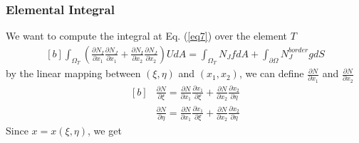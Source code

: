 \documentclass[]{article}
\begin{document}
\subsubsection{Elemental Integral} \label{sec: elem int}
  We want to compute the integral at Eq. (\ref{eq7}) over the element $T$
\begin{equation}\label{eq13}
	\begin{aligned}[b]
		\int_{\Omega_{T}} (\frac{\partial N_I}{\partial x_{1}}
		\frac{\partial N_J}{\partial x_{1}}+\frac{\partial N_I}{\partial x_{2}} 
		\frac{\partial N_J}{\partial x_{2}})U dA = \int_{\Omega_{T}} N_J f dA + \int_{\partial \Omega} N^{border}_J g dS
	\end{aligned}
\end{equation}
by the linear mapping between $(\xi,\eta)$ and $(x_{1},x_2)$, we can define $\frac{\partial N}{\partial x_{1}}$ and $\frac{\partial N}{\partial x_{2}}$
\begin{equation}\label{eq14}
	\begin{aligned}[b]
&
		\frac{\partial N}{\partial \xi} = \frac{\partial N}{\partial x_{1}}\frac{\partial x_{1}}{\partial \xi}+\frac{\partial N}{\partial x_{2}}\frac{\partial x_{2}}{\partial \eta}\\
& 
		\frac{\partial N}{\partial \eta} = \frac{\partial N}{\partial x_{1}}\frac{\partial x_{1}}{\partial \xi}+\frac{\partial N}{\partial x_{2}}\frac{\partial x_{2}}{\partial \eta}
	\end{aligned}
\end{equation}
Since $x=x(\xi,\eta)$, we get
\end{document}
